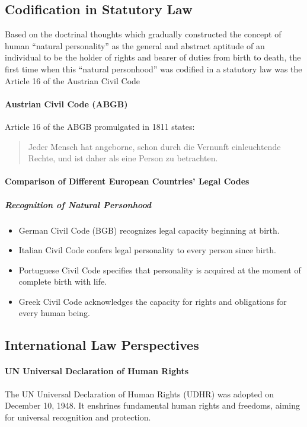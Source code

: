 \subsection{Codification in Statutory Law}
Based on the doctrinal thoughts which gradually constructed the concept of human “natural 
personality” as the general and abstract aptitude of an individual to be the holder of rights and 
bearer of duties from birth to death, the first time when this “natural personhood” was codified 
in a statutory law was the Article 16 of the Austrian Civil Code

\paragraph{Austrian Civil Code (ABGB)}
Article 16 of the ABGB promulgated in 1811 states: 
\begin{quote}
Jeder Mensch hat angeborne, schon durch die Vernunft einleuchtende Rechte, und ist daher als eine Person zu betrachten.
\end{quote}


\paragraph{Comparison of Different European Countries' Legal Codes}

\subparagraph{Recognition of Natural Personhood}
\begin{itemize}
    \item German Civil Code (BGB) recognizes legal capacity beginning at birth.
    \item Italian Civil Code confers legal personality to every person since birth.
    \item Portuguese Civil Code specifies that personality is acquired at the moment of complete birth with life.
    \item Greek Civil Code acknowledges the capacity for rights and obligations for every human being.
\end{itemize}

\subsection{International Law Perspectives}
\paragraph{UN Universal Declaration of Human Rights}

The UN Universal Declaration of Human Rights (UDHR) was adopted on December 10, 1948. It enshrines fundamental human rights and freedoms, aiming for universal recognition and protection.

